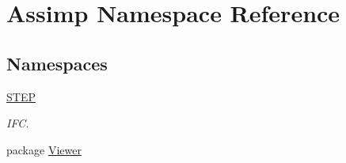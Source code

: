 \hypertarget{namespace_assimp}{\section{Assimp Namespace Reference}
\label{namespace_assimp}
}
\subsection*{Namespaces}
\begin{DoxyCompactItemize}
\item 
 \hyperlink{namespace_assimp_1_1_s_t_e_p}{S\+T\+E\+P}
\begin{DoxyCompactList}\small\item\em I\+F\+C. \end{DoxyCompactList}\item 
package \hyperlink{namespace_assimp_1_1_viewer}{Viewer}
\end{DoxyCompactItemize}

